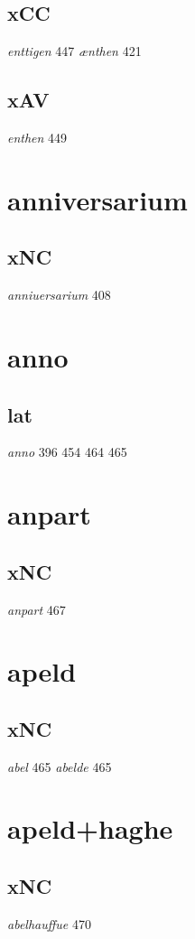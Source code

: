 \documentclass[a4paper,twocolumn]{article}
\begin{document}
\subsection{xCC}
\label{sec:orgf9ad334}
\emph{enttigen} 447 \emph{ænthen} 421 
\subsection{xAV}
\label{sec:org85ccd8f}
\emph{enthen} 449 
\section{anniversarium}
\label{sec:org817f074}
\subsection{xNC}
\label{sec:orgfeadbea}
\emph{anniuersarium} 408 
\section{anno}
\label{sec:org59a5ae0}
\subsection{lat}
\label{sec:org738cf62}
\emph{anno} 396 454 464 465 
\section{anpart}
\label{sec:org5437d69}
\subsection{xNC}
\label{sec:org2562865}
\emph{anpart} 467 
\section{apeld}
\label{sec:org6062522}
\subsection{xNC}
\label{sec:org96d4cb2}
\emph{abel} 465 \emph{abelde} 465 
\section{apeld+haghe}
\label{sec:orgb695bfb}
\subsection{xNC}
\label{sec:orgf78d43b}
\emph{abelhauffue} 470 
\end{document}

